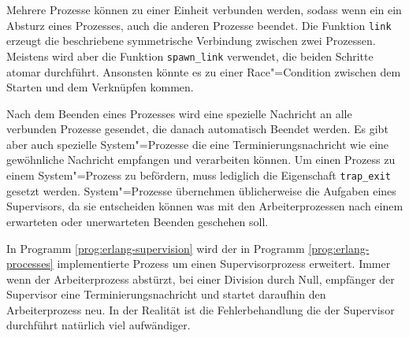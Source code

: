 Mehrere Prozesse können zu einer Einheit verbunden werden, sodass wenn ein ein Absturz eines Prozesses, auch die anderen Prozesse beendet. Die Funktion \lstinline{link} erzeugt die beschriebene symmetrische Verbindung zwischen zwei Prozessen. Meistens wird aber die Funktion \lstinline{spawn_link} verwendet, die beiden Schritte atomar durchführt. Ansonsten könnte es zu einer Race"=Condition zwischen dem Starten und dem Verknüpfen kommen.

Nach dem Beenden eines Prozesses wird eine spezielle Nachricht an alle verbunden Prozesse gesendet, die danach automatisch Beendet werden. Es gibt aber auch spezielle System"=Prozesse die eine Terminierungsnachricht wie eine gewöhnliche Nachricht empfangen und verarbeiten können. Um einen Prozess zu einem System"=Prozess zu befördern, muss lediglich die Eigenschaft \lstinline{trap_exit} gesetzt werden. System"=Prozesse übernehmen üblicherweise die Aufgaben eines Supervisors, da sie entscheiden können was mit den Arbeiterprozessen nach einem erwarteten oder unerwarteten Beenden geschehen soll.

In Programm \ref{prog:erlang-supervision} wird der in Programm \ref{prog:erlang-processes} implementierte Prozess um einen Supervisorprozess erweitert. Immer wenn der Arbeiterprozess abstürzt, \zB bei einer Division durch Null, empfänger der Supervisor eine Terminierungsnachricht und startet daraufhin den Arbeiterprozess neu. In der Realität ist die Fehlerbehandlung die der Supervisor durchführt natürlich viel aufwändiger.

